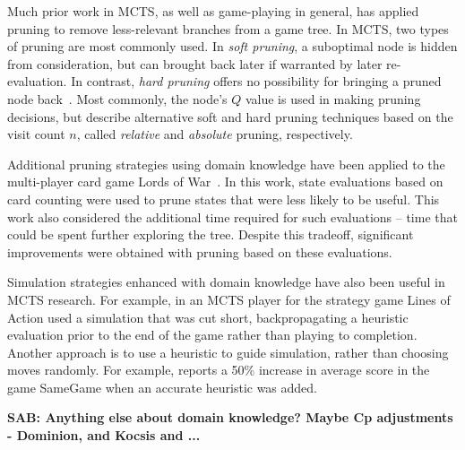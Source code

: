 \documentclass[letterpaper]{article}
\begin{document}
Much prior work in MCTS, as well as game-playing in general, has applied pruning to remove less-relevant branches from a game tree. In MCTS, two types of pruning are most commonly used. In {\it soft pruning}, a suboptimal node is hidden from consideration, but can brought back later if warranted by later re-evaluation. In contrast, {\it hard pruning} offers no possibility for bringing a pruned node back~\cite{browne2012survey}. Most commonly, the node's $Q$ value is used in making pruning decisions, but \cite{huang2010pruning} describe alternative soft and hard pruning techniques based on the visit count $n$, called {\it relative} and {\it absolute} pruning, respectively.

Additional pruning strategies using domain knowledge have been applied to the multi-player card game Lords of War~\cite{sephton2014ieee}. In this work, state evaluations based on card counting were used to prune states that were less likely to be useful. This work also considered the additional time required for such evaluations -- time that could be spent further exploring the tree. Despite this tradeoff, significant improvements were obtained with pruning based on these evaluations.

Simulation strategies enhanced with domain knowledge have also been useful in MCTS research. For example, in \cite{winands2010monte} an MCTS player for the strategy game Lines of Action used a simulation that was cut short, backpropagating a heuristic evaluation prior to the end of the game rather than playing to completion. Another approach is to use a heuristic to guide simulation, rather than choosing moves randomly. For example, \cite{schadd2012single} reports a 50\% increase in average score in the game SameGame when an accurate heuristic was added.

{\bf SAB: Anything else about domain knowledge? Maybe Cp adjustments - Dominion, and Kocsis and ...}
\end{document}
